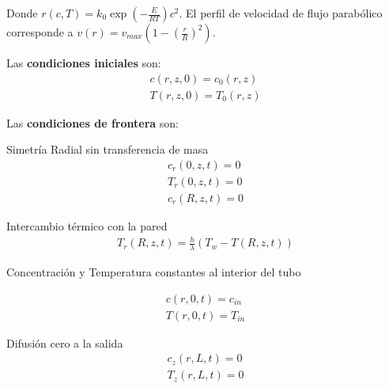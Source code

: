 \documentclass[11pt,letterpaper]{exam}
\begin{document}
\begin{questions}
Donde $r(c,T) = k_0 \exp(-\frac{E}{RT})c^2$.
El perfil de velocidad de flujo parabólico corresponde a $v(r) = v_{max} (1 - (\frac{r}{R})^2)$.

Las \textbf{condiciones iniciales} son:
\begin{align*}
	c(r,z,0) = c_0(r,z) \\
	T(r,z,0) = T_0(r,z)
\end{align*}

Las \textbf{condiciones de frontera} son:

Simetría Radial sin transferencia de masa 
\begin{align*}
	c_r(0,z,t) = 0 \\
	T_r(0,z,t) = 0 \\
	c_r(R,z,t) = 0
\end{align*}

Intercambio térmico con la pared
\begin{align*}
	T_r(R,z,t) = \frac{h}{\lambda}(T_w -T(R,z,t))
\end{align*}

Concentración y Temperatura constantes al interior del tubo

\begin{align*}
	c(r,0,t) = c_{in} \\
	T(r,0,t) = T_{in}
\end{align*}

Difusión cero a la salida
\begin{align*}
	c_z(r,L,t) = 0 \\
	T_z(r,L,t) = 0
\end{align*}

\end{questions}
\end{document}
